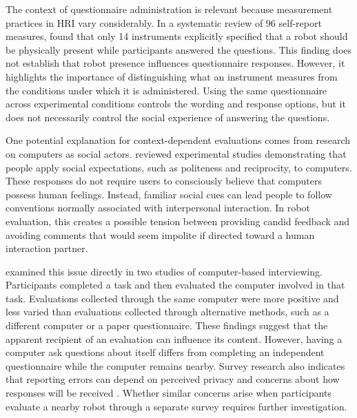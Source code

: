 \documentclass[sigconf,nonacm]{acmart}
\begin{document}
The context of questionnaire administration is relevant because measurement practices in HRI vary considerably. In a systematic review of 96 self-report measures, \citet{gillespie2026} found that only 14 instruments explicitly specified that a robot should be physically present while participants answered the questions. This finding does not establish that robot presence influences questionnaire responses. However, it highlights the importance of distinguishing what an instrument measures from the conditions under which it is administered. Using the same questionnaire across experimental conditions controls the wording and response options, but it does not necessarily control the social experience of answering the questions.

One potential explanation for context-dependent evaluations comes from research on computers as social actors. \citet{nass2000} reviewed experimental studies demonstrating that people apply social expectations, such as politeness and reciprocity, to computers. These responses do not require users to consciously believe that computers possess human feelings. Instead, familiar social cues can lead people to follow conventions normally associated with interpersonal interaction. In robot evaluation, this creates a possible tension between providing candid feedback and avoiding comments that would seem impolite if directed toward a human interaction partner.

\citet{nass1999} examined this issue directly in two studies of computer-based interviewing. Participants completed a task and then evaluated the computer involved in that task. Evaluations collected through the same computer were more positive and less varied than evaluations collected through alternative methods, such as a different computer or a paper questionnaire. These findings suggest that the apparent recipient of an evaluation can influence its content. However, having a computer ask questions about itself differs from completing an independent questionnaire while the computer remains nearby. Survey research also indicates that reporting errors can depend on perceived privacy and concerns about how responses will be received \cite{tourangeau2007}. Whether similar concerns arise when participants evaluate a nearby robot through a separate survey requires further investigation.
\end{document}
